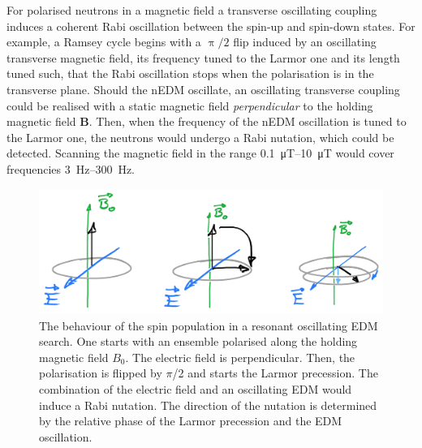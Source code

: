 
For polarised neutrons in a magnetic field a transverse oscillating coupling induces a coherent Rabi oscillation between the spin-up and spin-down states.
For example, a Ramsey cycle begins with a $\uppi/2$ flip induced by an oscillating transverse magnetic field, its frequency tuned to the Larmor one and its length tuned such, that the Rabi oscillation stops when the polarisation is in the transverse plane. Should the nEDM oscillate, an oscillating transverse coupling could be realised with a static magnetic field \emph{perpendicular} to the holding magnetic field $\mathbf{B}$. Then, when the frequency of the nEDM oscillation is tuned to the Larmor one, the neutrons would undergo a Rabi nutation, which could be detected. Scanning the magnetic field in the range \SIrange[range-phrase=--]{0.1}{10}{\micro\tesla} would cover frequencies \SIrange[range-phrase=--]{3}{300}{\hertz}.

\begin{figure}
  \centering
  \includegraphics[width=\linewidth]{gfx/axions/resonant_effect.png}
  \caption{The behaviour of the spin population in a resonant oscillating EDM search. One starts with an ensemble polarised along the holding magnetic field $B_0$. The electric field is perpendicular. Then, the polarisation is flipped by $\pi$/2 and starts the Larmor precession. The combination of the electric field and an oscillating EDM would induce a Rabi nutation. The direction of the nutation is determined by the relative phase of the Larmor precession and the EDM oscillation.}\label{fig:axions_resonant_effect}
\end{figure}

